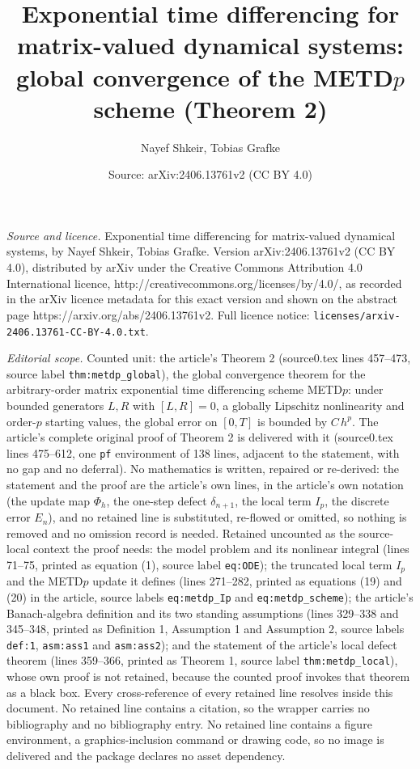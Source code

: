 \documentclass[10pt,a4paper]{amsart}
\title[Theorem 2]{Exponential time differencing for matrix-valued dynamical systems: global convergence of the METD$p$ scheme (Theorem 2)}
\author{Nayef Shkeir, Tobias Grafke}
\date{Source: arXiv:2406.13761v2 (CC BY 4.0)}
\begin{document}
\maketitle

\noindent\emph{Source and licence.} Exponential time differencing for matrix-valued dynamical systems, by Nayef Shkeir, Tobias Grafke. Version arXiv:2406.13761v2
(CC BY 4.0), distributed by arXiv under the Creative Commons Attribution 4.0 International licence,
http://creativecommons.org/licenses/by/4.0/, as recorded in the arXiv licence metadata for this exact
version and shown on the abstract page https://arxiv.org/abs/2406.13761v2. Full licence notice:
\texttt{licenses/arxiv-2406.13761-CC-BY-4.0.txt}.\par\smallskip

\noindent\textit{Editorial scope.} Counted unit: the article's Theorem 2 (source0.tex lines 457--473, source label \texttt{thm:metdp\_global}), the global convergence theorem for the arbitrary-order matrix exponential time differencing scheme METD$p$: under bounded generators $L,R$ with $[L,R]=0$, a globally Lipschitz nonlinearity and order-$p$ starting values, the global error on $[0,T]$ is bounded by $C\,h^{p}$. The article's complete original proof of Theorem 2 is delivered with it (source0.tex lines 475--612, one \texttt{pf} environment of 138 lines, adjacent to the statement, with no gap and no deferral). No mathematics is written, repaired or re-derived: the statement and the proof are the article's own lines, in the article's own notation (the update map $\Phi_h$, the one-step defect $\delta_{n+1}$, the local term $I_p$, the discrete error $E_n$), and no retained line is substituted, re-flowed or omitted, so nothing is removed and no omission record is needed. Retained uncounted as the source-local context the proof needs: the model problem and its nonlinear integral (lines 71--75, printed as equation (1), source label \texttt{eq:ODE}); the truncated local term $I_p$ and the METD$p$ update it defines (lines 271--282, printed as equations (19) and (20) in the article, source labels \texttt{eq:metdp\_Ip} and \texttt{eq:metdp\_scheme}); the article's Banach-algebra definition and its two standing assumptions (lines 329--338 and 345--348, printed as Definition 1, Assumption 1 and Assumption 2, source labels \texttt{def:1}, \texttt{asm:ass1} and \texttt{asm:ass2}); and the statement of the article's local defect theorem (lines 359--366, printed as Theorem 1, source label \texttt{thm:metdp\_local}), whose own proof is not retained, because the counted proof invokes that theorem as a black box. Every cross-reference of every retained line resolves inside this document. No retained line contains a citation, so the wrapper carries no bibliography and no bibliography entry. No retained line contains a figure environment, a graphics-inclusion command or drawing code, so no image is delivered and the package declares no asset dependency.
\end{document}
